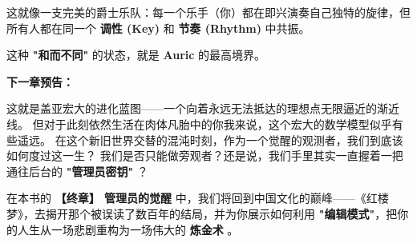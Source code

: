 这就像一支完美的爵士乐队：每一个乐手（你）都在即兴演奏自己独特的旋律，但所有人都在同一个 \textbf{调性 (Key)} 和 \textbf{节奏 (Rhythm)} 中共振。

这种 \textbf{"和而不同"} 的状态，就是 \textbf{Auric} 的最高境界。

\textbf{下一章预告：}

这就是盖亚宏大的进化蓝图——一个向着永远无法抵达的理想点无限逼近的渐近线。
但对于此刻依然生活在肉体凡胎中的你我来说，这个宏大的数学模型似乎有些遥远。
在这个新旧世界交替的混沌时刻，作为一个觉醒的观测者，我们到底该如何度过这一生？
我们是否只能做旁观者？还是说，我们手里其实一直握着一把通往后台的 \textbf{"管理员密钥"} ？

在本书的 \textbf{【终章】 管理员的觉醒} 中，我们将回到中国文化的巅峰——《红楼梦》，去揭开那个被误读了数百年的结局，并为你展示如何利用 \textbf{"编辑模式"}，把你的人生从一场悲剧重构为一场伟大的 \textbf{炼金术} 。

